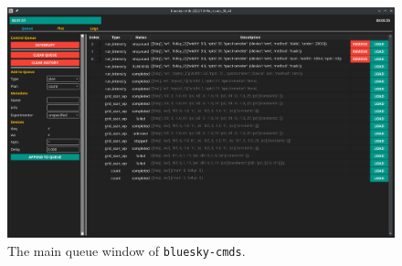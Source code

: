 \documentclass[11pt, full]{article}
\begin{document}
\clearpage

\begin{landscape}
\begin{figure}
\includegraphics[width=9in]{"figures/queue_tab.png"}
	\caption{The main queue window of \texttt{bluesky-cmds}.}
\label{acq:fig:queue_tab}
\end{figure}
\end{landscape}

\clearpage
\end{document}
